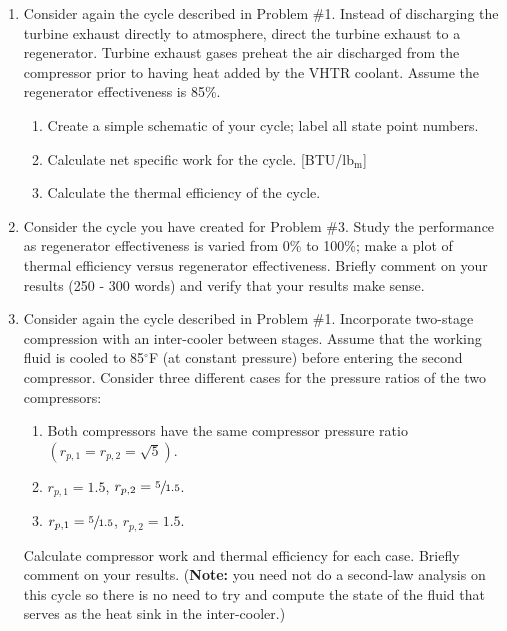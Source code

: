 \begin{fullwidth}
\begin{enumerate}
\item Consider again the cycle described in Problem \#1.  Instead of discharging the turbine exhaust directly to atmosphere, direct the turbine exhaust to a regenerator.  Turbine exhaust gases preheat the air discharged from the compressor prior to having heat added by the VHTR coolant.  Assume the regenerator effectiveness is 85\%.
\begin{enumerate}
\item Create a simple schematic of your cycle; label all state point numbers.
\item Calculate net specific work for the cycle. [BTU/lb$_{\text{m}}$]
\item Calculate the thermal efficiency of the cycle.
\end{enumerate}

\vspace{1.0cm}

\item Consider the cycle you have created for Problem \#3.  Study the performance as regenerator effectiveness is varied from 0\% to 100\%; make a plot of thermal efficiency versus regenerator effectiveness.  Briefly comment on your results (250 - 300 words) and verify that your results make sense.

\vspace{1.0cm}

\item Consider again the cycle described in Problem \#1.  Incorporate two-stage compression with an inter-cooler between stages.  Assume that the working fluid is cooled to 85$^{\circ}$F (at constant pressure) before entering the second compressor.  Consider three different cases for the pressure ratios of the two compressors:
\begin{enumerate}
\item Both compressors have the same compressor pressure ratio $(r_{p,1} = r_{p,2} = \sqrt{5})$.
\item $r_{p,1}=1.5$, $r_{p,2}= \sfrac{5}{1.5}$.
\item $r_{p,1} = \sfrac{5}{1.5}$, $r_{p,2}=1.5$.
\end{enumerate}
Calculate compressor work and thermal efficiency for each case.  Briefly comment on  your results. (\textbf{Note:} you need not do a second-law analysis on this cycle so there is no need to try and compute the state of the fluid that serves as the heat sink in the inter-cooler.)

\vspace{1.0cm}


\end{enumerate}
\end{fullwidth}
